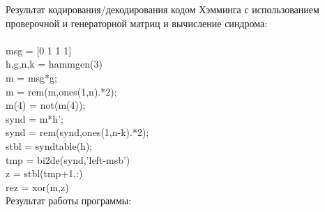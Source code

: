 \documentclass[12pt,a4paper]{report}
\begin{document}
Результат кодирования/декодирования кодом Хэмминга с использованием проверочной и генераторной матриц и вычисление синдрома:\\\\
msg = [0 1 1 1]\\
{h,g,n,k} = hammgen(3)\\
m = msg*g;\\
m = rem(m,ones(1,n).*2);\\
m(4) = not(m(4));\\
synd = m*h';\\
synd = rem(synd,ones(1,n-k).*2);\\
stbl = syndtable(h);\\
tmp = bi2de(synd,'left-msb')\\
z = stbl(tmp+1,:)\\
rez = xor(m,z)\\
\newpage
Результат работы программы:
\begin{figure}[h!]
\end{figure}
\begin{figure}[h!]
\end{figure}
\end{document}

